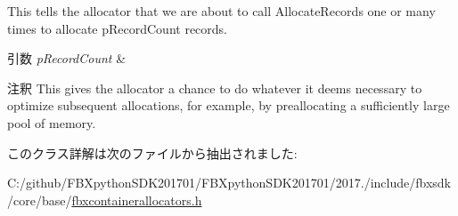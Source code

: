 This tells the allocator that we are about to call Allocate\+Records one or many times to allocate p\+Record\+Count records. 
\begin{DoxyParams}{引数}
{\em p\+Record\+Count} & \\
\hline
\end{DoxyParams}
\begin{DoxyRemark}{注釈}
This gives the allocator a chance to do whatever it deems necessary to optimize subsequent allocations, for example, by preallocating a sufficiently large pool of memory. 
\end{DoxyRemark}


このクラス詳解は次のファイルから抽出されました\+:\begin{DoxyCompactItemize}
\item 
C\+:/github/\+F\+B\+Xpython\+S\+D\+K201701/\+F\+B\+Xpython\+S\+D\+K201701/2017./include/fbxsdk/core/base/\hyperlink{fbxcontainerallocators_8h}{fbxcontainerallocators.\+h}\end{DoxyCompactItemize}
